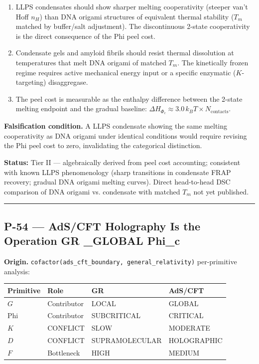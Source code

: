\documentclass[12pt,a4paper]{article}
\begin{document}
\begin{enumerate}
    \item LLPS condensates should show sharper melting cooperativity (steeper van't Hoff $n_H$) than DNA origami structures of equivalent thermal stability ($T_m$ matched by buffer/salt adjustment). The discontinuous 2-state cooperativity is the direct consequence of the Phi peel cost.
    \item Condensate gels and amyloid fibrils should resist thermal dissolution at temperatures that melt DNA origami of matched $T_m$. The kinetically frozen regime requires active mechanical energy input or a specific enzymatic ($K$-targeting) disaggregase.
    \item The peel cost is measurable as the enthalpy difference between the 2-state melting endpoint and the gradual baseline: $\Delta H_{\Phi_c} \approx 3.0\,k_BT \times N_{\text{contacts}}$.
\end{enumerate}

\textbf{Falsification condition.} A LLPS condensate showing the same melting cooperativity as DNA origami under identical conditions would require revising the Phi peel cost to zero, invalidating the categorical distinction.

\textbf{Status:} Tier II --- algebraically derived from peel cost accounting; consistent with known LLPS phenomenology (sharp transitions in condensate FRAP recovery; gradual DNA origami melting curves). Direct head-to-head DSC comparison of DNA origami vs. condensate with matched $T_m$ not yet published.

\begin{center}
\rule{0.5\textwidth}{0.4pt}
\end{center}

\subsection{P-54 --- AdS/CFT Holography Is the Operation GR \otimes \langleG\_GLOBAL \otimes Phi\_c\rangle}

\textbf{Origin.} \texttt{cofactor(ads\_cft\_boundary, general\_relativity)} per-primitive analysis:

\begin{table}[htbp]
\centering
\small
{}
\begin{tabularx}{\textwidth}{>{\centering\arraybackslash}X >{\centering\arraybackslash}X >{\centering\arraybackslash}X >{\centering\arraybackslash}X}
\toprule
\rowcolor{gray!25}\textbf{Primitive} & \textbf{Role} & \textbf{GR} & \textbf{AdS/CFT} \\
\midrule
\rowcolors{1}{white}{gray!10}
$G$ & Contributor & LOCAL & GLOBAL \\
Phi & Contributor & SUBCRITICAL & CRITICAL \\
$K$ & CONFLICT & SLOW & MODERATE \\
$D$ & CONFLICT & SUPRAMOLECULAR & HOLOGRAPHIC \\
$F$ & Bottleneck & HIGH & MEDIUM \\
\bottomrule
\end{tabularx}
\end{table}
\end{document}
